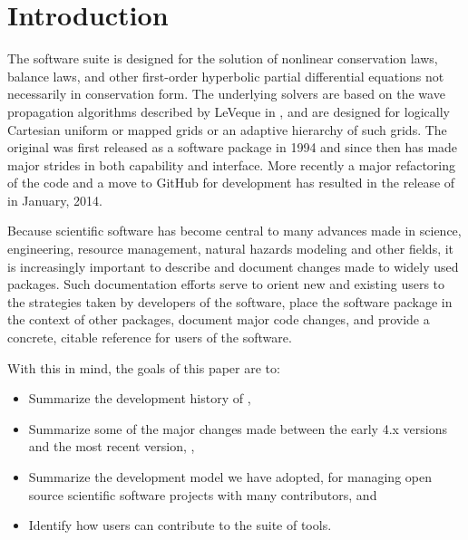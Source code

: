 %
%
%

\section{Introduction}\label{sec:intro}

The \clawpack software suite \cite{clawpack} is designed for the solution of
nonlinear conservation laws, balance laws, and other first-order hyperbolic
partial differential equations not necessarily in conservation form.  The
underlying solvers are based on the wave propagation algorithms described by
LeVeque in \cite{rjl:fvmhp}, and are designed for logically Cartesian uniform or
mapped grids or an adaptive hierarchy of such grids.  The original \clawpack was
first released as a software package in 1994 and since then has made major
strides in both capability and interface. More recently a major refactoring of
the code and a move to GitHub for development has resulted in the release of
 in January, 2014.  

Because scientific software  has become central to many advances made
in science, engineering, resource management, natural hazards modeling
and other fields, it is increasingly important to describe and
document changes made to widely used packages.  Such documentation efforts
serve to orient new and existing users to the  strategies
taken by developers of the software, place the software package in the context
of other packages, document major code changes, and provide a
concrete, citable reference for users of the software.

With this in mind, the goals of this paper are to:

\begin{itemize}
\item Summarize the development history of \clawpack,
\item Summarize some of the major changes made between the early \clawpack
4.x versions and the most recent version, ,
\item Summarize the development model we have adopted, for
managing open source scientific software
projects with many contributors, and
\item Identify how users can contribute to the \clawpack suite of tools.
\end{itemize}

